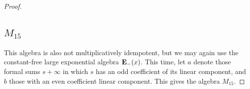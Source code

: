 \documentclass[eqnor,reqno]{amsart}
\theoremstyle{plain}
\newtheorem{lem}[thm]{Lemma}
\theoremstyle{definition}
\begin{document}
\begin{proof}
\subsection{$M_{15}$} 
This algebra is also not multiplicatively idempotent, but we may again use the constant-free large exponential algebra ${\bf E}_-(x)$. 
This time, let $a$ denote those formal sums $s+\infty$ in which $s$ has an odd coefficient of its linear component, and $b$ those with an even coefficient linear component.  This gives the algebra $M_{15}$.


%


\end{proof}
\end{document}
